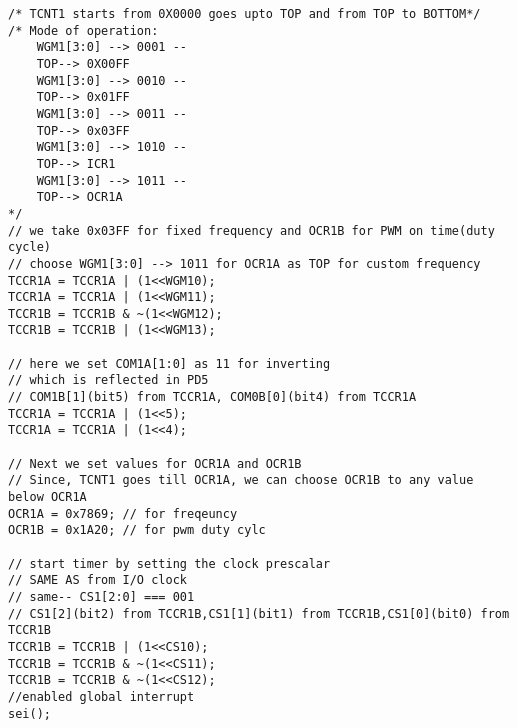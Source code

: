 \begin{verbatim}
/* TCNT1 starts from 0X0000 goes upto TOP and from TOP to BOTTOM*/
/* Mode of operation:
    WGM1[3:0] --> 0001 --
    TOP--> 0X00FF
    WGM1[3:0] --> 0010 --
    TOP--> 0x01FF
    WGM1[3:0] --> 0011 --
    TOP--> 0x03FF
    WGM1[3:0] --> 1010 --
    TOP--> ICR1
    WGM1[3:0] --> 1011 --
    TOP--> OCR1A
*/
// we take 0x03FF for fixed frequency and OCR1B for PWM on time(duty cycle)
// choose WGM1[3:0] --> 1011 for OCR1A as TOP for custom frequency
TCCR1A = TCCR1A | (1<<WGM10);
TCCR1A = TCCR1A | (1<<WGM11);
TCCR1B = TCCR1B & ~(1<<WGM12);
TCCR1B = TCCR1B | (1<<WGM13);		

// here we set COM1A[1:0] as 11 for inverting
// which is reflected in PD5
// COM1B[1](bit5) from TCCR1A, COM0B[0](bit4) from TCCR1A
TCCR1A = TCCR1A | (1<<5);
TCCR1A = TCCR1A | (1<<4);
    
// Next we set values for OCR1A and OCR1B
// Since, TCNT1 goes till OCR1A, we can choose OCR1B to any value below OCR1A
OCR1A = 0x7869; // for freqeuncy
OCR1B = 0x1A20; // for pwm duty cylc

// start timer by setting the clock prescalar
// SAME AS from I/O clock
// same-- CS1[2:0] === 001
// CS1[2](bit2) from TCCR1B,CS1[1](bit1) from TCCR1B,CS1[0](bit0) from TCCR1B
TCCR1B = TCCR1B | (1<<CS10);
TCCR1B = TCCR1B & ~(1<<CS11);
TCCR1B = TCCR1B & ~(1<<CS12);
//enabled global interrupt
sei();
\end{verbatim}


